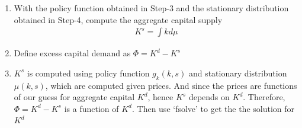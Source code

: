 \documentclass{article}
\begin{document}
\begin{spacing}{1.5}
\begin{enumerate}
\item With the policy function obtained in Step-3 and the stationary distribution obtained in Step-4, compute the aggregate capital supply
\begin{align*}
K^s=\int k d\mu
\end{align*}
\item Define excess capital demand as $\Phi=K^d-K^s$
\item $K^s$ is computed using policy function $g_k(k,s)$ and stationary distribution $\mu(k,s)$, which are computed given prices. And since the prices are functions of our guess for aggregate capital $K^d$, hence $K^s$ depends on $K^d$. Therefore, $\Phi=K^d-K^s$ is a function of $K^d$. Then use `fsolve' to get the the solution for $K^d$\\
\end{enumerate}


\end{spacing}
\end{document}
